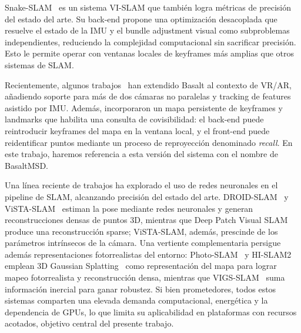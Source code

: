 Snake-SLAM~\cite{ruckert2021snakeslam} es un sistema VI-SLAM que también logra métricas de precisión del estado del arte. Su back-end propone una optimización desacoplada que resuelve el estado de la IMU y el bundle adjustment visual como subproblemas independientes, reduciendo la complejidad computacional sin sacrificar precisión. Esto le permite operar con ventanas locales de keyframes más amplias que otros sistemas de SLAM.


Recientemente, algunos trabajos~\cite{demayo2025monadoslamdataset, zanotti2024basaltxr} han extendido Basalt al contexto de VR/AR, añadiendo soporte para más de dos cámaras no paralelas y tracking de features asistido por IMU. Además, incorporaron un mapa persistente de keyframes y landmarks que habilita una consulta de covisibilidad: el back-end puede reintroducir keyframes del mapa en la ventana local, y el front-end puede reidentificar puntos mediante un proceso de reproyección denominado \textit{recall}. En este trabajo, haremos referencia a esta versión del sistema con el nombre de BasaltMSD.


Una línea reciente de trabajos ha explorado el uso de redes neuronales en el pipeline de SLAM, alcanzando precisión del estado del arte. DROID-SLAM~\cite{teed2021droid} y ViSTA-SLAM~\cite{zhang2026vistaslam} estiman la pose mediante redes neuronales y generan reconstrucciones densas de puntos 3D, mientras que Deep Patch Visual SLAM~\cite{lipson2024dpvslam} produce una reconstrucción sparse; ViSTA-SLAM, además, prescinde de los parámetros intrínsecos de la cámara. Una vertiente complementaria persigue además representaciones fotorrealistas del entorno: Photo-SLAM~\cite{huang2024photoslam} y HI-SLAM2~\cite{zhang2025hislam2} emplean 3D Gaussian Splatting~\cite{kerbl20233dgaussiansplatting} como representación del mapa para lograr mapeo fotorrealista y reconstrucción densa, mientras que VIGS-SLAM~\cite{zhu2026vigsslam} suma información inercial para ganar robustez. Si bien prometedores, todos estos sistemas comparten una elevada demanda computacional, energética y la dependencia de GPUs, lo que limita su aplicabilidad en plataformas con recursos acotados, objetivo central del presente trabajo.

